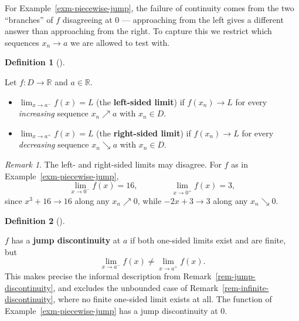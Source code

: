 \documentclass[
  letterpaper,
  DIV=11,
  numbers=noendperiod]{scrreprt}
\providecommand{\tightlist}{%
  \setlength{\itemsep}{0pt}\setlength{\parskip}{0pt}}
\theoremstyle{plain}
\theoremstyle{plain}
\theoremstyle{definition}
\newtheorem{definition}{Definition}[chapter]
\theoremstyle{definition}
\theoremstyle{definition}
\theoremstyle{plain}
\theoremstyle{plain}
\theoremstyle{remark}
\newtheorem{refremark}{Remark}[chapter]
\begin{document}
For Example~\ref{exm-piecewise-jump}, the failure of continuity comes
from the two ``branches'' of \(f\) disagreeing at \(0\) --- approaching
from the left gives a different answer than approaching from the right.
To capture this we restrict which sequences \(x_n\to a\) we are allowed
to test with.

\begin{definition}[]\protect\hypertarget{def-one-sided-limits}{}\label{def-one-sided-limits}

\hfill\break
Let \(f\colon D\to\mathbb{R}\) and \(a\in\mathbb{R}\).

\begin{itemize}
\tightlist
\item
  \(\displaystyle\lim_{x\to a^-} f(x) = L\) (the \textbf{left-sided
  limit}) if \(f(x_n)\to L\) for every \emph{increasing} sequence
  \(x_n \nearrow a\) with \(x_n\in D\).
\item
  \(\displaystyle\lim_{x\to a^+} f(x) = L\) (the \textbf{right-sided
  limit}) if \(f(x_n)\to L\) for every \emph{decreasing} sequence
  \(x_n \searrow a\) with \(x_n\in D\).
\end{itemize}

\end{definition}

\begin{refremark}
The left- and right-sided limits may disagree. For \(f\) as in
Example~\ref{exm-piecewise-jump}, \[
\lim_{x\to0^-} f(x) = 16, \qquad\qquad \lim_{x\to0^+} f(x) = 3,
\] since \(x^3+16\to16\) along any \(x_n\nearrow0\), while \(-2x+3\to3\)
along any \(x_n\searrow0\).

\label{rem-one-sided-disagree}

\end{refremark}

\begin{definition}[]\protect\hypertarget{def-jump-discontinuity}{}\label{def-jump-discontinuity}

\hfill\break
\(f\) has a \textbf{jump discontinuity} at \(a\) if both one-sided
limits exist and are finite, but \[
\lim_{x\to a^-} f(x) \neq \lim_{x\to a^+} f(x).
\] This makes precise the informal description from
Remark~\ref{rem-jump-discontinuity}, and excludes the unbounded case of
Remark~\ref{rem-infinite-discontinuity}, where no finite one-sided limit
exists at all. The function of Example~\ref{exm-piecewise-jump} has a
jump discontinuity at \(0\).

\end{definition}
\end{document}
